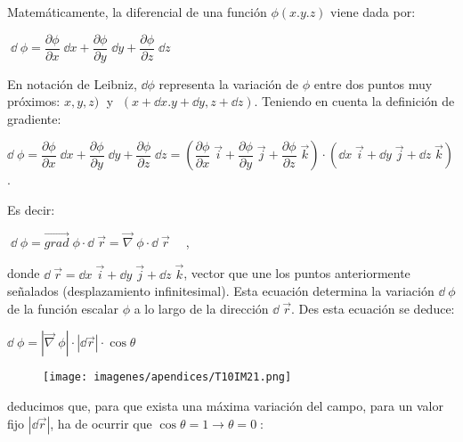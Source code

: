 Matemáticamente, la diferencial de una función $\phi (x.y.z)$ viene dada por:

\vspace{4mm}\centerline {$\boxed{ \; \dd \; \phi = \dfrac {\partial \phi}{\partial x}\; \dd x +  \dfrac {\partial \phi}{\partial y}\; \dd y + \dfrac {\partial \phi}{\partial z}\; \dd z \; }$}

\vspace{2mm} En notación de Leibniz, $\dd \phi$ representa la variación de $\phi$ entre dos puntos muy próximos: $x,y,z)\; $ y $\; (x+\dd x. y +\dd y, z +\dd z)$. Teniendo en cuenta la definición de gradiente:

\small{$\dd \; \phi = \dfrac {\partial \phi}{\partial x}\; \dd x +  \dfrac {\partial \phi}{\partial y}\; \dd y + \dfrac {\partial \phi}{\partial z}\; \dd z = \left( \dfrac {\partial \phi}{\partial x}\; \vec i + \dfrac {\partial \phi}{\partial y}\; \vec j + \dfrac {\partial \phi}{\partial z}\; \vec k     \right) \cdot (\dd x \; \vec i + \dd y \; \vec j + \dd z \; \vec k)$}\normalsize{.}

\begin{multicols}{2}
\vspace{3mm} Es decir:
 
$\boxed {\; \dd\; \phi = \overrightarrow {grad}\; \phi \cdot \dd \; \vec r = \overrightarrow { \nabla} \; \phi \cdot \dd \; \vec r \;} \quad$, 

donde $\dd \; \vec r = \dd x \; \vec i +\dd y \; \vec j + \dd z \; \vec k$, vector que une los puntos anteriormente señalados (desplazamiento infinitesimal). Esta ecuación determina la variación  $\dd \; \phi$ de la función escalar $\phi$ a lo largo de la dirección $\dd \; \vec r$. Des esta ecuación se deduce:

$\dd \; \phi = |\overrightarrow{\nabla}\; \phi |\cdot |\dd \vec r|\cdot \cos \theta$

	\begin{figure}[H]
	\centering
	\texttt{[image: imagenes/apendices/T10IM21.png]}
	\end{figure}
\end{multicols}
deducimos que, para que exista una máxima variación del campo, para un valor fijo $|\dd \vec r|$, ha de ocurrir que 
$\cos \theta=1 \to \theta = 0\; $:  

\vspace{3mm}
\vspace{3mm}

